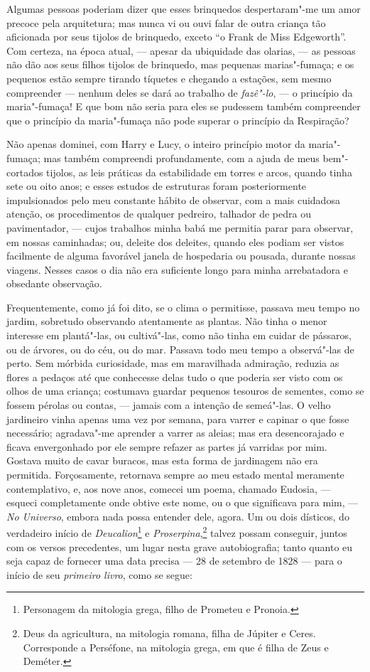Algumas pessoas poderiam dizer que esses brinquedos despertaram"-me
um amor precoce pela arquitetura; mas nunca vi ou ouvi falar de outra
criança tão aficionada por seus tijolos de brinquedo, exceto ``o Frank
de Miss Edgeworth''. Com certeza, na época atual, --- apesar da
ubiquidade das olarias, --- as pessoas não dão aos seus filhos tijolos de
brinquedo, mas pequenas marias"-fumaça; e os pequenos estão sempre
tirando tíquetes e chegando a estações, sem mesmo compreender --- nenhum
deles se dará ao trabalho de \textit{fazê"-lo}, --- o princípio da
maria"-fumaça! E que bom não seria para eles se pudessem também
compreender que o princípio da maria"-fumaça não pode superar o princípio
da Respiração?

Não apenas dominei, com Harry e Lucy, o inteiro princípio motor da
maria"-fumaça; mas também compreendi profundamente, com a ajuda de meus
bem"-cortados tijolos, as leis práticas da estabilidade em torres e
arcos, quando tinha sete ou oito anos; e esses estudos de estruturas
foram posteriormente impulsionados pelo meu constante hábito de
observar, com a mais cuidadosa atenção, os procedimentos de qualquer
pedreiro, talhador de pedra ou pavimentador, --- cujos trabalhos minha
babá me permitia parar para observar, em nossas caminhadas; ou, deleite
dos deleites, quando eles podiam ser vistos facilmente de alguma
favorável janela de hospedaria ou pousada, durante nossas viagens.
Nesses casos o dia não era suficiente longo para minha arrebatadora e
obsedante observação.

Frequentemente, como já foi dito, se o clima o permitisse, passava
meu tempo no jardim, sobretudo observando atentamente as plantas. Não
tinha o menor interesse em plantá"-las, ou cultivá"-las, como não tinha em
cuidar de pássaros, ou de árvores, ou do céu, ou do mar. Passava todo
meu tempo a observá"-las de perto. Sem mórbida curiosidade, mas em
maravilhada admiração, reduzia as flores a pedaços até que conhecesse
delas tudo o que poderia ser visto com os olhos de uma criança;
costumava guardar pequenos tesouros de sementes, como se fossem pérolas
ou contas, --- jamais com a intenção de semeá"-las. O velho jardineiro
vinha apenas uma vez por semana, para varrer e capinar o que fosse
necessário; agradava"-me aprender a varrer as aleias; mas era
desencorajado e ficava envergonhado por ele sempre refazer as partes já
varridas por mim. Gostava muito de cavar buracos, mas esta forma de
jardinagem não era permitida. Forçosamente, retornava sempre ao meu
estado mental meramente contemplativo, e, aos nove anos, comecei um
poema, chamado Eudosia, --- esqueci completamente onde obtive este nome,
ou o que significava para mim, --- \textit{No Universo}, embora nada
possa entender dele, agora. Um ou dois dísticos, do verdadeiro início de
\textit{Deucalion}\footnote{Personagem da mitologia grega, filho de
  Prometeu e Pronoia.} e \textit{Proserpina},\footnote{Deus
  da agricultura, na mitologia romana, filha de Júpiter e Ceres.
  Corresponde a Perséfone, na mitologia grega, em que é filha de Zeus e
  Deméter.} talvez possam conseguir, juntos com os
versos precedentes, um lugar nesta grave autobiografia; tanto quanto eu
seja capaz de fornecer uma data precisa --- 28 de setembro de 1828 ---
para o início de seu \textit{primeiro livro}, como se segue: %

